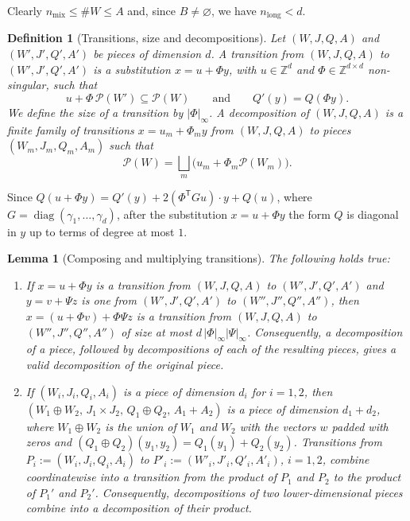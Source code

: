 \documentclass[a4paper,reqno,12pt]{amsart}
\theoremstyle{plain}
\newtheorem{lemma}[theorem]{Lemma}
\theoremstyle{plain}
\newtheorem{definition}[theorem]{Definition}
\theoremstyle{remark}
\theoremstyle{plain}
\newcommand{\cP}{\mathscr{P}}
\newcommand{\Z}{\mathbb{Z}}
\theoremstyle{plain}
\theoremstyle{plain}
\begin{document}
{Clearly $n_{\mathrm{mix}}\le\#W\le A$ and, since $B\ne\varnothing$, we have $n_{\mathrm{long}}<d$.

\begin{definition}[Transitions, size and decompositions]\label{def:transition}
Let $(W,J,Q,A)$ and $(W',J',Q',A')$ be pieces of dimension $d$. A \emph{transition} from
$(W,J,Q,A)$ to $(W',J',Q',A')$ is a substitution $x=u+\Phi y$, with $u\in\Z^d$ and
$\Phi\in\Z^{d\times d}$ non-singular, such that
\[
 u+\Phi\,\cP(W')\subseteq\cP(W)\qquad\text{and}\qquad Q'(y)=Q(\Phi y).
\]
We define the size of a transition by $|\Phi|_\infty$. A \emph{decomposition} of $(W,J,Q,A)$ is a finite family of
transitions $x=u_m+\Phi_my$ from $(W,J,Q,A)$ to pieces $(W_m,J_m,Q_m,A_m)$ such that
\[
\cP(W)=\bigsqcup_m\bigl(u_m+\Phi_m\cP(W_m)\bigr).
\]
\end{definition}

Since $Q(u+\Phi y)=Q'(y)+2(\Phi^{\mathsf T}Gu)\cdot y+Q(u)$, where
$G=\operatorname{diag}(\gamma_1,{\ldots},\gamma_d)$, after the substitution $x=u+\Phi y$ the form $Q$ is
diagonal in $y$ up to terms of degree at most $1$.

\begin{lemma}[Composing and multiplying transitions]\label{lem:compose}
The following holds true:
\begin{enumerate}
\item If $x=u+\Phi y$ is a transition from $(W,J,Q,A)$ to $(W',J',Q',A')$ and $y=v+\Psi z$ is one
from $(W',J',Q',A')$ to $(W'',J'',Q'',A'')$, then $x=(u+\Phi v)+\Phi\Psi z$ is a transition from
$(W,J,Q,A)$ to $(W'',J'',Q'',A'')$ of size at most $d\,|\Phi|_\infty|\Psi|_\infty$. Consequently, a
decomposition of a piece, followed by decompositions of each of the resulting pieces, gives a
valid decomposition of the original piece.
\item If $(W_i,J_i,Q_i,A_i)$ is a piece of dimension $d_i$ for $i=1,2$, then
$(W_1\oplus W_2,\,J_1\times J_2,\,Q_1\oplus Q_2,\,A_1+A_2)$ is a piece of dimension $d_1+d_2$, where
$W_1\oplus W_2$ is the union of $W_1$ and $W_2$ with the vectors $w$ padded with zeros and
$(Q_1\oplus Q_2)(y_1,y_2)=Q_1(y_1)+Q_2(y_2)$. Transitions from $P_i := (W_i,J_i,Q_i,A_i)$ to
$P'_i := (W'_i,J'_i,Q'_i,A'_i)$, $i=1,2$, combine coordinatewise into a transition from the product of 
$P_1$ and $P_2$ to the product of $P_1'$ and $P_2'$. Consequently, decompositions of two lower-dimensional 
pieces combine into a decomposition of their product.
\end{enumerate}
\end{lemma}

}
\end{document}
